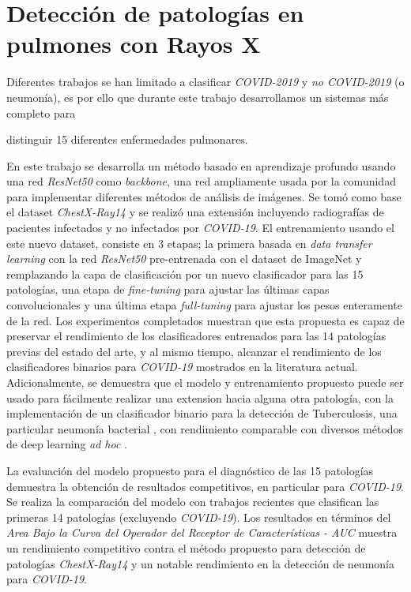 \section{Detección de patologías en pulmones con Rayos X}

Diferentes trabajos se han limitado a clasificar \textit{COVID-2019} y \textit{no COVID-2019} (o
neumonía), es por ello que durante este trabajo desarrollamos un sistemas más completo para {
distinguir 15 diferentes enfermedades pulmonares.

En este trabajo se desarrolla un método basado en aprendizaje profundo usando una red \textit{ResNet50}
como \textit{backbone}, una red ampliamente usada por la comunidad para implementar diferentes métodos
de análisis de imágenes. Se tomó como base el dataset \textit{ChestX-Ray14} y se realizó una extensión
incluyendo radiografías de pacientes infectados y no infectados por \textit{COVID-19}. El entrenamiento
usando el este nuevo dataset, consiste en 3 etapas; la primera basada en \textit{data transfer learning}
con la red \textit{ResNet50} pre-entrenada con el dataset de ImageNet y remplazando la capa de clasificación
por un nuevo clasificador para las 15 patologías, una etapa de \textit{fine-tuning} para ajustar las
últimas capas convolucionales y una última etapa \textit{full-tuning} para ajustar los pesos enteramente
de la red. Los experimentos completados muestran que esta propuesta es capaz de preservar el rendimiento
de los clasificadores entrenados para las 14 patologías previas del estado del arte, y al mismo tiempo,
alcanzar el rendimiento de los clasificadores binarios para \textit{COVID-19} mostrados en la literatura
actual. Adicionalmente, se demuestra que el modelo y entrenamiento propuesto puede ser usado para
fácilmente realizar una extension hacia alguna otra patología, con la implementación de un clasificador
binario para la detección de Tuberculosis, una particular neumonía bacterial \cite{stirenko2018chest},
con rendimiento comparable con diversos métodos de deep learning \emph{ad hoc} \cite{puttagunta2021detection}.

La evaluación del modelo propuesto para el diagnóstico de las 15 patologías demuestra la obtención de
resultados competitivos, en particular para \textit{COVID-19}. Se realiza la comparación del modelo con
trabajos recientes que clasifican las primeras 14 patologías (excluyendo \textit{COVID-19}). Los
resultados en términos del \textit{Area Bajo la Curva del Operador del Receptor de Características  - AUC }
muestra un rendimiento competitivo contra el método propuesto para detección de patologías
\textit{ChestX-Ray14} y un notable rendimiento en la detección de neumonía para \textit{COVID-19}.

}
